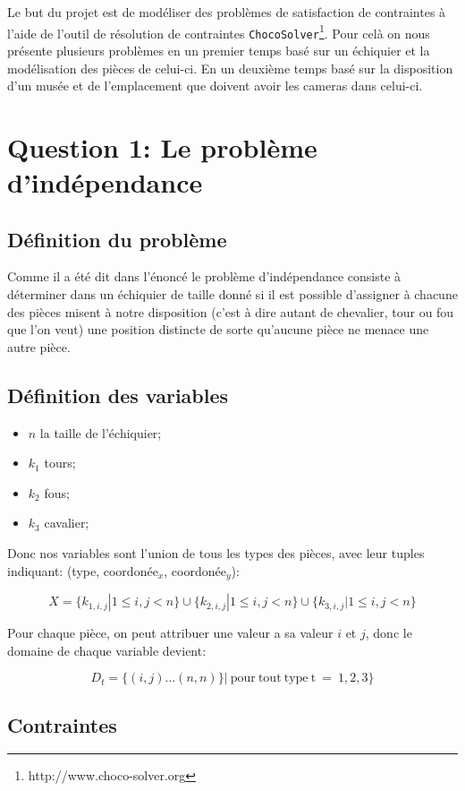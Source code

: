 \documentclass[letterpaper]{article}
\begin{document}
Le but du projet est de modéliser des problèmes de satisfaction de contraintes
à l'aide de l'outil de résolution de contraintes \texttt{ChocoSolver}\footnote{http://www.choco-solver.org}. Pour celà
on nous présente plusieurs problèmes en un premier temps basé sur un échiquier
et la modélisation des pièces de celui-ci. En un deuxième temps basé sur la
disposition d'un musée et de l'emplacement que doivent avoir les cameras dans
celui-ci.

\section{Question 1: Le problème d'indépendance}

\subsection{Définition du problème}

Comme il a été dit dans l'énoncé le problème d'indépendance consiste à
déterminer dans un échiquier de taille donné si il est possible d'assigner à
chacune des pièces misent à notre disposition (c'est à dire autant de
chevalier, tour ou fou que l'on veut) une position distincte de sorte qu'aucune
pièce ne menace une autre pièce.

\subsection{Définition des variables}

\begin{itemize}
\item $n$ la taille de l'échiquier;
\item $k_1$ tours;
\item $k_2$ fous;
\item $k_3$ cavalier;
\end{itemize}

Donc nos variables sont l'union de tous les types des pièces, avec
leur tuples indiquant: (type, coordonée$_x$, coordonée$_y$):

$$ X = \{k_{1,i,j} | 1 \leq i,j < n \} \cup \{k_{2,i,j} | 1 \leq i,j
< n \} \cup \{k_{3,i,j} | 1 \leq i,j < n \} $$

Pour chaque pièce, on peut attribuer une valeur a sa valeur $i$ et
$j$, donc le domaine de chaque variable devient:

$$ D_t = \{(i,j)...(n,n)\} |\ \mathrm{pour\ tout\ type\ t\ =\ 1, 2,
  3} \}$$

\subsection{Contraintes}
\end{document}
